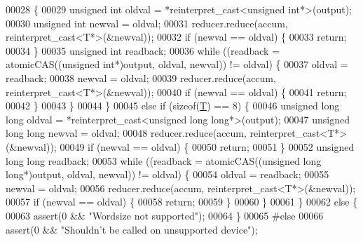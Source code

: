 \begin{DoxyCode}
00028   \{
00029     \textcolor{keywordtype}{unsigned} \textcolor{keywordtype}{int} oldval = *\textcolor{keyword}{reinterpret\_cast<}\textcolor{keywordtype}{unsigned} \textcolor{keywordtype}{int}*\textcolor{keyword}{>}(output);
00030     \textcolor{keywordtype}{unsigned} \textcolor{keywordtype}{int} newval = oldval;
00031     reducer.reduce(accum, reinterpret\_cast<T*>(&newval));
00032     \textcolor{keywordflow}{if} (newval == oldval) \{
00033       \textcolor{keywordflow}{return};
00034     \}
00035     \textcolor{keywordtype}{unsigned} \textcolor{keywordtype}{int} readback;
00036     \textcolor{keywordflow}{while} ((readback = atomicCAS((\textcolor{keywordtype}{unsigned} \textcolor{keywordtype}{int}*)output, oldval, newval)) != oldval) \{
00037       oldval = readback;
00038       newval = oldval;
00039       reducer.reduce(accum, reinterpret\_cast<T*>(&newval));
00040       \textcolor{keywordflow}{if} (newval == oldval) \{
00041         \textcolor{keywordflow}{return};
00042       \}
00043     \}
00044   \}
00045   \textcolor{keywordflow}{else} \textcolor{keywordflow}{if} (\textcolor{keyword}{sizeof}(\hyperlink{group___sparse_core___module_class_eigen_1_1_triplet}{T}) == 8) \{
00046     \textcolor{keywordtype}{unsigned} \textcolor{keywordtype}{long} \textcolor{keywordtype}{long} oldval = *\textcolor{keyword}{reinterpret\_cast<}\textcolor{keywordtype}{unsigned} \textcolor{keywordtype}{long} \textcolor{keywordtype}{long}*\textcolor{keyword}{>}(output);
00047     \textcolor{keywordtype}{unsigned} \textcolor{keywordtype}{long} \textcolor{keywordtype}{long} newval = oldval;
00048     reducer.reduce(accum, reinterpret\_cast<T*>(&newval));
00049     \textcolor{keywordflow}{if} (newval == oldval) \{
00050       \textcolor{keywordflow}{return};
00051     \}
00052     \textcolor{keywordtype}{unsigned} \textcolor{keywordtype}{long} \textcolor{keywordtype}{long} readback;
00053     \textcolor{keywordflow}{while} ((readback = atomicCAS((\textcolor{keywordtype}{unsigned} \textcolor{keywordtype}{long} \textcolor{keywordtype}{long}*)output, oldval, newval)) != oldval) \{
00054       oldval = readback;
00055       newval = oldval;
00056       reducer.reduce(accum, reinterpret\_cast<T*>(&newval));
00057       \textcolor{keywordflow}{if} (newval == oldval) \{
00058         \textcolor{keywordflow}{return};
00059       \}
00060     \}
00061   \}
00062   \textcolor{keywordflow}{else} \{
00063     assert(0 && \textcolor{stringliteral}{"Wordsize not supported"});
00064   \}
00065 \textcolor{preprocessor}{#else}
00066   assert(0 && \textcolor{stringliteral}{"Shouldn't be called on unsupported device"});

\end{DoxyCode}
